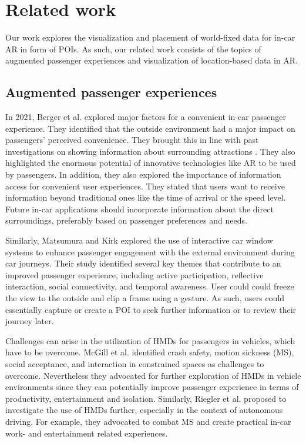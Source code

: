 \section{Related work}
\label{section:related}
Our work explores the visualization and placement of world-fixed data for in-car AR in form of POIs. As such, our related work consists of the topics of augmented passenger experiences and visualization of location-based data in AR.


\subsection{Augmented passenger experiences}
In 2021, Berger et al. \cite{BergerGridStudyInCarPassenger2021} explored major factors for a convenient in-car passenger experience. They identified that the outside environment had a major impact on passengers' perceived convenience. They brought this in line with past investigations on showing information about surrounding attractions \cite{BergerTactile19, MatsumuraActivePassengering18}. They also highlighted the enormous potential of innovative technologies like AR to be used by passengers. In addition, they also explored the importance of information access for convenient user experiences. They stated that users want to receive information beyond traditional ones like the time of arrival or the speed level. Future in-car applications should incorporate information about the direct surroundings, preferably based on passenger preferences and needs.

Similarly, Matsumura and Kirk \cite{MatsumuraActivePassengering18} explored the use of interactive car window systems to enhance passenger engagement with the external environment during car journeys. Their study identified several key themes that contribute to an improved passenger experience, including active participation, reflective interaction, social connectivity, and temporal awareness. User could could freeze the view to the outside and clip a frame using a gesture. As such, users could essentially capture or create a POI to seek further information or to review their journey later.

Challenges can arise in the utilization of HMDs for passengers in vehicles, which have to be overcome. McGill et al. \cite{mcgill2020challenges} identified crash safety, motion sickness (MS), social acceptance, and interaction in constrained spaces as challenges to overcome. Nevertheless they advocated for further exploration of HMDs in vehicle environments since they can potentially improve passenger experience in terms of productivity, entertainment and isolation. Similarly, Riegler et al. \cite{riegler2020agenda} proposed to investigate the use of HMDs further, especially in the context of autonomous driving. For example, they advocated to combat MS and create practical in-car work- and entertainment related experiences. 

